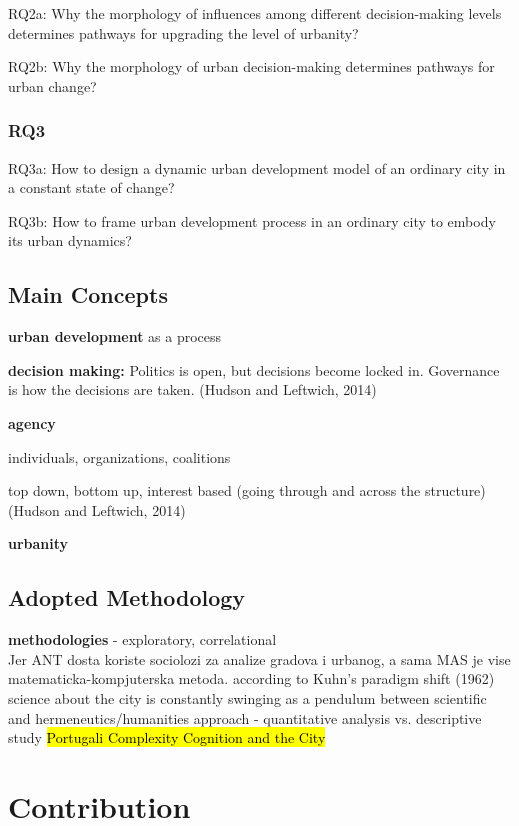 \documentclass[11pt]{report}
\begin{document}
RQ2a: Why the morphology of influences among different decision-making levels determines pathways for upgrading the level of urbanity?

RQ2b: Why the morphology of urban decision-making determines pathways for urban change? 

\subsubsection{RQ3}

RQ3a: How to design a dynamic urban development model of an ordinary city in a constant state of change? 

RQ3b: How to frame urban development process in an ordinary city to embody its urban dynamics?

\subsection{Main Concepts}

\textbf{urban development} as a process

\textbf{decision making:}
Politics is open, but decisions become locked in. Governance is how the decisions are taken. (Hudson and Leftwich, 2014)

\textbf{agency}

individuals, organizations, coalitions

top down, bottom up, interest based (going through and across the structure) (Hudson and Leftwich, 2014)

\textbf{urbanity}

\subsection{Adopted Methodology}

\textbf{methodologies} - exploratory, correlational
\\
Jer ANT dosta koriste sociolozi za analize gradova i urbanog, a sama MAS je vise matematicka-kompjuterska metoda. 
according to Kuhn's paradigm shift (1962) science about the city is constantly swinging as a pendulum between scientific and hermeneutics/humanities approach - quantitative analysis vs. descriptive study \hl{Portugali Complexity Cognition and the City}

\section{Contribution}
\end{document}
